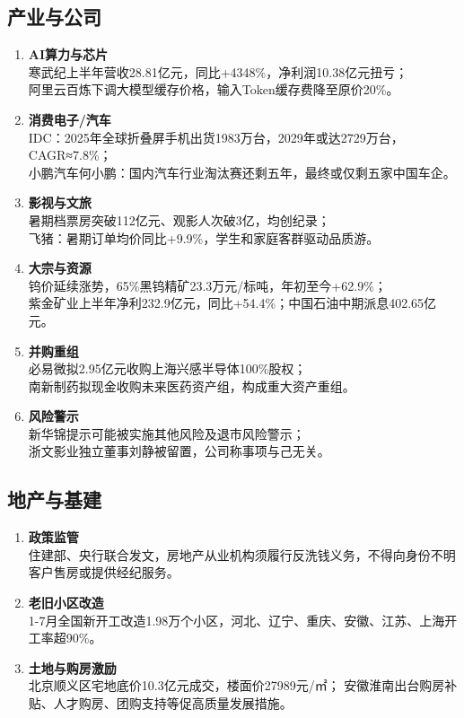 \subsection{产业与公司}
\begin{enumerate}[leftmargin=*, nosep]
    \item \textbf{AI算力与芯片}  \\
    寒武纪上半年营收28.81亿元，同比+4348\%，净利润10.38亿元扭亏；  \\
    阿里云百炼下调大模型缓存价格，输入Token缓存费降至原价20\%。
    \item \textbf{消费电子/汽车}  \\
    IDC：2025年全球折叠屏手机出货1983万台，2029年或达2729万台，CAGR≈7.8\%；  \\
    小鹏汽车何小鹏：国内汽车行业淘汰赛还剩五年，最终或仅剩五家中国车企。
    \item \textbf{影视与文旅}  \\
    暑期档票房突破112亿元、观影人次破3亿，均创纪录；  \\
    飞猪：暑期订单均价同比+9.9\%，学生和家庭客群驱动品质游。
    \item \textbf{大宗与资源}  \\
    钨价延续涨势，65\%黑钨精矿23.3万元/标吨，年初至今+62.9\%；  \\
    紫金矿业上半年净利232.9亿元，同比+54.4\%；中国石油中期派息402.65亿元。
    \item \textbf{并购重组}  \\
    必易微拟2.95亿元收购上海兴感半导体100\%股权；  \\
    南新制药拟现金收购未来医药资产组，构成重大资产重组。
    \item \textbf{风险警示}  \\
    新华锦提示可能被实施其他风险及退市风险警示；  \\
    浙文影业独立董事刘静被留置，公司称事项与己无关。
\end{enumerate}

\subsection{地产与基建}
\begin{enumerate}[leftmargin=*, nosep]
    \item \textbf{政策监管}  \\
    住建部、央行联合发文，房地产从业机构须履行反洗钱义务，不得向身份不明客户售房或提供经纪服务。
    \item \textbf{老旧小区改造}  \\
    1-7月全国新开工改造1.98万个小区，河北、辽宁、重庆、安徽、江苏、上海开工率超90\%。
    \item \textbf{土地与购房激励}  \\
    北京顺义区宅地底价10.3亿元成交，楼面价27989元/㎡；  
    安徽淮南出台购房补贴、人才购房、团购支持等促高质量发展措施。
\end{enumerate}

